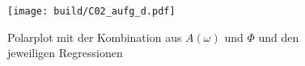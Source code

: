 \begin{figure}
    \centering
    \texttt{[image: build/C02\_aufg\_d.pdf]}
    \caption{Polarplot mit der Kombination aus $A(\omega)$ und $\Phi$ und den jeweiligen Regressionen}
    \label{fig:d_polarplot}
\end{figure}